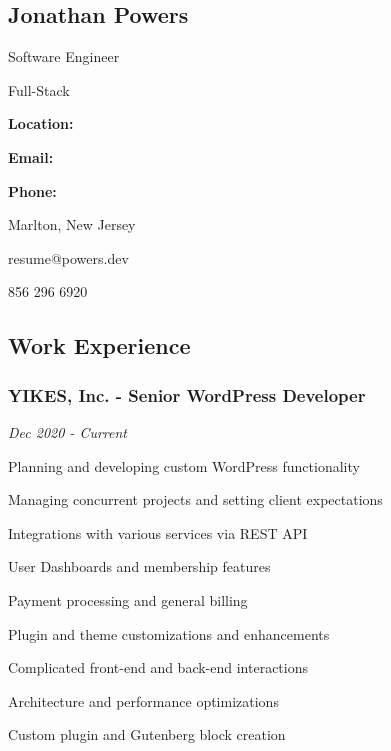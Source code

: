 \documentclass{article}
\newenvironment{narrow_list}{
	\begin{itemize}
		\setlength{\itemsep}{0pt}
		\setlength{\parskip}{-1pt}
		\setlength{\parsep}{0pt}
	}{\end{itemize}
}
\begin{document}

	\begin{multicols}{2}

		\section*{Jonathan Powers}

		Software Engineer

		Full-Stack

	\columnbreak

		\vspace{3mm}

		\setlength{\columnsep}{-4cm}

		\begin{multicols}{2}

			\textbf{Location:} 

			\textbf{Email:} 

			\textbf{Phone:} 

		\columnbreak

			Marlton, New Jersey

			resume@powers.dev

			856 296 6920
		
		\end{multicols}

		\vspace{3mm}

	\end{multicols}



	\subsection*{Work Experience}


	\vspace{2mm}

	\subsubsection*{YIKES, Inc. - Senior WordPress Developer}

	\vspace{-1.5mm}

	\textit{Dec 2020 - Current}

	Planning and developing custom WordPress functionality

	\begin{narrow_list}
		\item Managing concurrent projects and setting client expectations
		\item Integrations with various services via REST API
		\item User Dashboards and membership features
		\item Payment processing and general billing
		\item Plugin and theme customizations and enhancements
		\item Complicated front-end and back-end interactions
		\item Architecture and performance optimizations
		\item Custom plugin and Gutenberg block creation
	\end{narrow_list}
\end{document}
